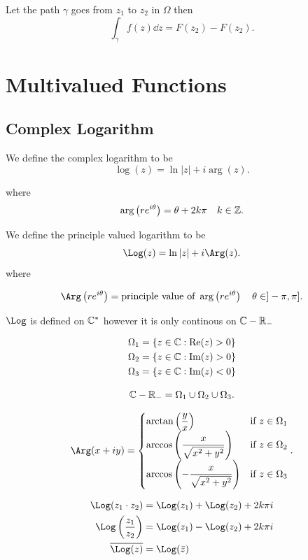 \documentclass{report}
\begin{document}

Let the path $\gamma$ goes from $z_1$ to $z_2$ in $\Omega$ then
\[
	\int_\gamma f(z)\dd{z} = F(z_2)-F(z_2)
	.\]

\nt{
	\[
		\oint_\gamma f(z)\dd{z}=0\;\Rightarrow f\text{ is holomorphic in }\Omega
		.\]

}

\chapter{Multivalued Functions}

\section{Complex Logarithm}

We define the complex logarithm to be
\[
	\log(z) = \ln|z| + i\arg(z)
	.\]

where
\[
	\arg\lt(re^{i\theta}\rt) = \theta + 2k\pi \quad k \in \ZZ
	.\]

We define the principle valued logarithm to be
\[
	\Log(z) = \ln|z| + i \Arg(z)
	.\]
where

\[
	\Arg\lt(re^{i\theta}\rt) = \text{principle value of } \arg\lt(re^{i\theta}\rt)\quad \theta\in]-\pi,\pi]
	.\]

$\Log$ is defined on $\CC^*$ however it is only continous on $\CC - \RR_-$

\begin{align*}
	\Omega_1 & = \{z\in\CC: \Re(z)>0\} \\
	\Omega_2 & = \{z\in\CC: \Im(z)>0\} \\
	\Omega_3 & = \{z\in\CC: \Im(z)<0\}
\end{align*}

\[
	\CC-\RR_- = \Omega_1 \cup \Omega_2 \cup \Omega_3
	.\]

\[
	\Arg(x+iy) = \begin{cases}
		\arctan\lt(\dfrac{y}{x}\rt)               & \text{if }z\in\Omega_1 \\
		\arccos\lt(\dfrac{x}{\sqrt{x^2+y^2}}\rt)  & \text{if }z\in\Omega_2 \\
		\arccos\lt(-\dfrac{x}{\sqrt{x^2+y^2}}\rt) & \text{if }z\in\Omega_3
	\end{cases}
	.\]

\begin{align*}
	\Log(z_1\cdot z_2)           & = \Log(z_1) + \Log(z_2) + 2k\pi i \\
	\Log\lt(\dfrac{z_1}{z_2}\rt) & = \Log(z_1) - \Log(z_2) + 2k\pi i \\
	\overline{\Log(z)}           & = \Log(\bar{z})
\end{align*}
\end{document}
